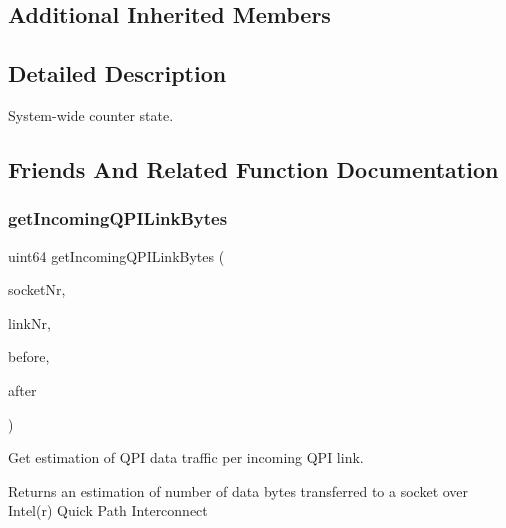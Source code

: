\subsection*{Additional Inherited Members}


\subsection{Detailed Description}
System-\/wide counter state. 

\subsection{Friends And Related Function Documentation}
\mbox{\label{class_system_counter_state_aca1b1d8ba1679c4a0c394c2647428fd3}} 
\subsubsection{\texorpdfstring{get\+Incoming\+Q\+P\+I\+Link\+Bytes}{getIncomingQPILinkBytes}\hspace{0.1cm}{\footnotesize\ttfamily [1/2]}}
{\footnotesize\ttfamily uint64 get\+Incoming\+Q\+P\+I\+Link\+Bytes (\begin{DoxyParamCaption}\item[{uint32}]{socket\+Nr,  }\item[{uint32}]{link\+Nr,  }\item[{const \mbox{\hyperlink{class_system_counter_state}{System\+Counter\+State}} \&}]{before,  }\item[{const \mbox{\hyperlink{class_system_counter_state}{System\+Counter\+State}} \&}]{after }\end{DoxyParamCaption})\hspace{0.3cm}{\ttfamily [friend]}}



Get estimation of Q\+PI data traffic per incoming Q\+PI link. 

Returns an estimation of number of data bytes transferred to a socket over Intel(r) Quick Path Interconnect


